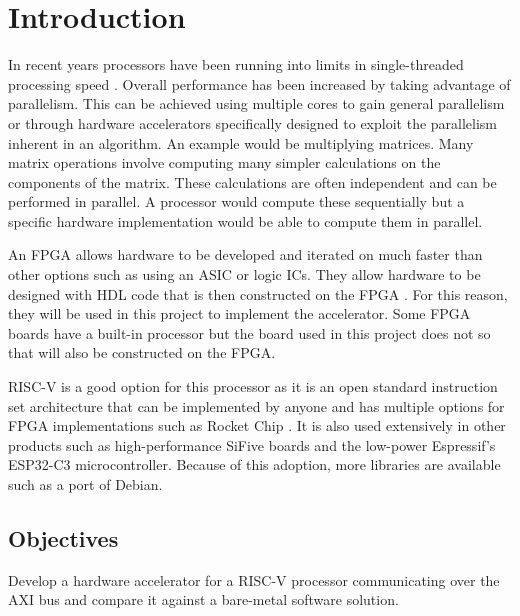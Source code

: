 \section{Introduction}
In recent years processors have been running into limits in single-threaded processing speed \cite{cpu_clk_speed}. Overall performance has been increased by taking advantage of parallelism. This can be achieved using multiple cores to gain general parallelism or through hardware accelerators specifically designed to exploit the parallelism inherent in an algorithm. An example would be multiplying matrices. Many matrix operations involve computing many simpler calculations on the components of the matrix. These calculations are often independent and can be performed in parallel. A processor would compute these sequentially but a specific hardware implementation would be able to compute them in parallel.

An FPGA allows hardware to be developed and iterated on much faster than other options such as using an ASIC or logic ICs. They allow hardware to be designed with HDL code that is then constructed on the FPGA \cite{whatisanfpga}. For this reason, they will be used in this project to implement the accelerator. Some FPGA boards have a built-in processor but the board used in this project does not so that will also be constructed on the FPGA.

RISC-V is a good option for this processor as it is an open standard instruction set architecture \cite{risc} that can be implemented by anyone and has multiple options for FPGA implementations such as Rocket Chip \cite{rocketchip}. It is also used extensively in other products such as high-performance SiFive boards and the low-power Espressif's ESP32-C3 microcontroller. Because of this adoption, more libraries are available such as a port of Debian.

\newpage
\subsection{Objectives}

Develop a hardware accelerator for a RISC-V processor communicating over the AXI bus and compare it against a bare-metal software solution.

